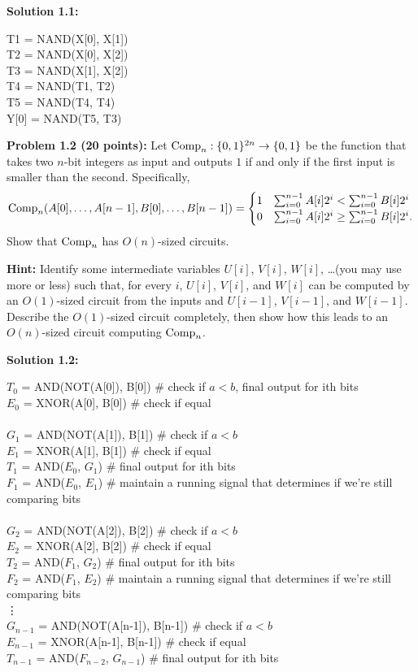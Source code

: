 \documentclass[11pt]{article}
\begin{document}
\textbf{Solution 1.1:} %

T1 = NAND(X[0], X[1]) \\
T2 = NAND(X[0], X[2]) \\
T3 = NAND(X[1], X[2]) \\
T4 = NAND(T1, T2) \\
T5 = NAND(T4, T4) \\
Y[0] = NAND(T5, T3)

\newpage

\textbf{Problem 1.2 (20 points):} Let $\mathrm{Comp}_n:\{0,1\}^{2n} \to \{0,1\}$ be the function that takes two $n$-bit integers as input and outputs $1$ if and only if  the first input is smaller than the second. Specifically,
$$\mathrm{Comp}_n(A[0], \ldots, A[n-1], B[0], \ldots, B[n-1]) = 
\begin{cases}
1 & \sum_{i=0}^{n-1} A[i]2^i < \sum_{i=0}^{n-1} B[i]2^i\\
0 & \sum_{i=0}^{n-1} A[i]2^i \ge \sum_{i=0}^{n-1} B[i]2^i.
\end{cases}$$
 Show that $\mathrm{Comp}_n$ has $O(n)$-sized circuits. 

{\bf Hint: } Identify some intermediate variables $U[i]$, $V[i]$, $W[i]$, \ldots (you may use more or less) such that, for every $i$, $U[i]$, $V[i]$, and $W[i]$ can be computed by an $O(1)$-sized circuit from the inputs and $U[i-1]$, $V[i-1]$, and $W[i-1]$. Describe the $O(1)$-sized circuit completely, then show how this leads to an $O(n)$-sized circuit computing $\mathrm{Comp}_n$.

\textbf{Solution 1.2:}

$T_0$ = AND(NOT(A[0]), B[0]) \# check if $a<b$, final output for ith bits \\
$E_0$ = XNOR(A[0], B[0]) \# check if equal \\
\\
$G_1$ = AND(NOT(A[1]), B[1]) \# check if $a<b$ \\
$E_1$ = XNOR(A[1], B[1]) \# check if equal \\
$T_1$ = AND($E_0$, $G_1$) \# final output for ith bits \\ 
$F_1$ = AND($E_0$, $E_1$) \# maintain a running signal that determines if we're still comparing bits \\
\\
$G_2$ = AND(NOT(A[2]), B[2]) \# check if $a<b$ \\
$E_2$ = XNOR(A[2], B[2]) \# check if equal \\
$T_2$ = AND($F_1$, $G_2$) \# final output for ith bits \\ 
$F_2$ = AND($F_1$, $E_2$) \# maintain a running signal that determines if we're still comparing bits \\
\vdots \\
$G_{n-1}$ = AND(NOT(A[n-1]), B[n-1]) \# check if $a<b$ \\
$E_{n-1}$ = XNOR(A[n-1], B[n-1]) \# check if equal \\
$T_{n-1}$ = AND($F_{n-2}$, $G_{n-1}$) \# final output for ith bits \\ 
\\
\end{document}
